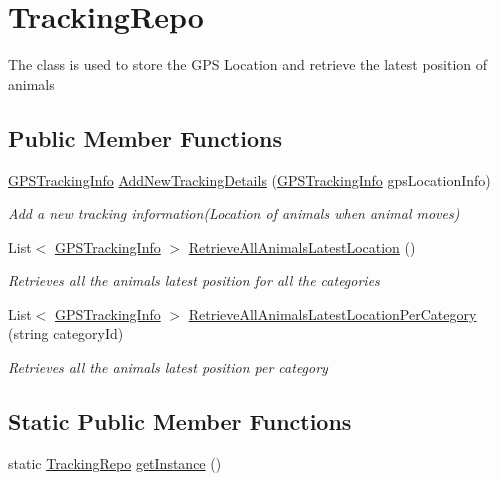 \hypertarget{classWildLifeTracker_1_1Repository_1_1TrackingRepo}{}\section{Tracking\+Repo}
\label{classWildLifeTracker_1_1Repository_1_1TrackingRepo}


The class is used to store the G\+PS Location and retrieve the latest position of animals  


\subsection*{Public Member Functions}
\begin{DoxyCompactItemize}
\item 
\hyperlink{classWildLifeTracker_1_1Models_1_1GPSTrackingInfo}{G\+P\+S\+Tracking\+Info} \hyperlink{classWildLifeTracker_1_1Repository_1_1TrackingRepo_a6eb233393913005b573dd88cf166b95a}{Add\+New\+Tracking\+Details} (\hyperlink{classWildLifeTracker_1_1Models_1_1GPSTrackingInfo}{G\+P\+S\+Tracking\+Info} gps\+Location\+Info)
\begin{DoxyCompactList}\small\item\em Add a new tracking information(\+Location of animals when animal moves) \end{DoxyCompactList}\item 
List$<$ \hyperlink{classWildLifeTracker_1_1Models_1_1GPSTrackingInfo}{G\+P\+S\+Tracking\+Info} $>$ \hyperlink{classWildLifeTracker_1_1Repository_1_1TrackingRepo_a39ffe359b825a23eb35d132e4a4989e0}{Retrieve\+All\+Animals\+Latest\+Location} ()
\begin{DoxyCompactList}\small\item\em Retrieves all the animal\textquotesingle{}s latest position for all the categories \end{DoxyCompactList}\item 
List$<$ \hyperlink{classWildLifeTracker_1_1Models_1_1GPSTrackingInfo}{G\+P\+S\+Tracking\+Info} $>$ \hyperlink{classWildLifeTracker_1_1Repository_1_1TrackingRepo_ac084ee298dc17161640dbdd4e11de5c5}{Retrieve\+All\+Animals\+Latest\+Location\+Per\+Category} (string category\+Id)
\begin{DoxyCompactList}\small\item\em Retrieves all the animal\textquotesingle{}s latest position per category \end{DoxyCompactList}\end{DoxyCompactItemize}
\subsection*{Static Public Member Functions}
\begin{DoxyCompactItemize}
\item 
static \hyperlink{classWildLifeTracker_1_1Repository_1_1TrackingRepo}{Tracking\+Repo} \hyperlink{classWildLifeTracker_1_1Repository_1_1TrackingRepo_abafc75f4ead187ecad6033c4386250d2}{get\+Instance} ()
\end{DoxyCompactItemize}
